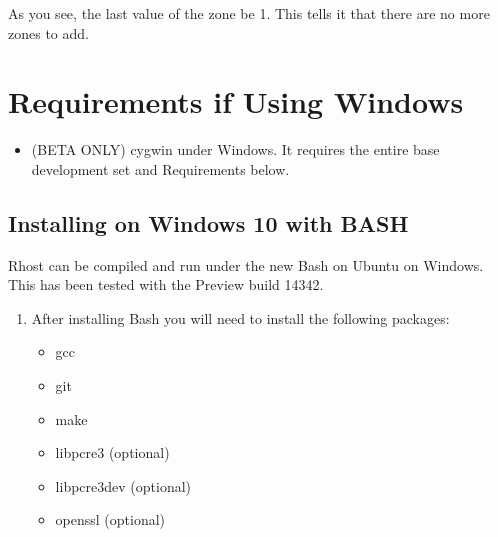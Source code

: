 \documentclass[letterpaper,10pt,english]{sphinxmanual}
\begin{document}
\begin{sphinxVerbatim}[commandchars=\\\{\}]
\end{sphinxVerbatim}

\sphinxAtStartPar
As you see, the last value of the zone  be \sphinxhyphen{}1.  This tells it
that there are no more zones to add.


\chapter{Requirements if Using Windows}
\label{\detokenize{windows:requirements-if-using-windows}}\label{\detokenize{windows:windows-requirements}}\label{\detokenize{windows::doc}}\begin{itemize}
\item {} 
\sphinxAtStartPar
(BETA ONLY) cygwin under Windows.  It requires the entire base development set and Requirements below.

\end{itemize}


\section{Installing on Windows 10 with BASH}
\label{\detokenize{windows:installing-on-windows-10-with-bash}}
\sphinxAtStartPar
Rhost can be compiled and run under the new Bash on Ubuntu on Windows.
This has been tested with the Preview build 14342.
\begin{enumerate}
%
\item {} 
\sphinxAtStartPar
After installing Bash you will need to install the following packages:
\begin{itemize}
\item {} 
\sphinxAtStartPar
gcc

\item {} 
\sphinxAtStartPar
git

\item {} 
\sphinxAtStartPar
make

\item {} 
\sphinxAtStartPar
libpcre3 (optional)

\item {} 
\sphinxAtStartPar
libpcre3\sphinxhyphen{}dev (optional)

\item {} 
\sphinxAtStartPar
openssl (optional)

\end{itemize}

\end{enumerate}
\end{document}
